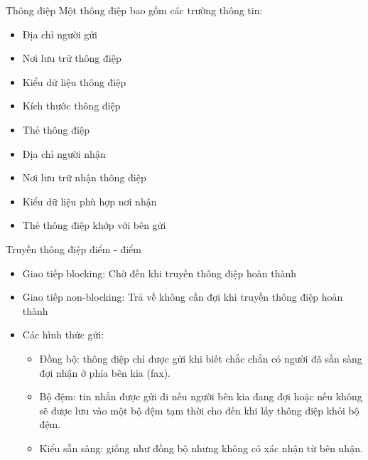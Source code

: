 \documentclass[10pt]{beamer}
\theoremstyle{remark}
\numberwithin{algocf}{section}
\numberwithin{equation}{section}
\numberwithin{dl}{section}
\numberwithin{figure}{section}
\begin{document}
\begin{frame}{Thông điệp}
    Một thông điệp bao gồm các trường thông tin:
    \begin{itemize}
        \item Địa chỉ người gửi
        \item Nơi lưu trữ thông điệp
        \item Kiểu dữ liệu thông điệp
        \item Kích thước thông điệp
        \item Thẻ thông điệp
        \item Địa chỉ người nhận 
        \item Nơi lưu trữ nhận thông điệp
        \item Kiểu dữ liệu phù hợp nơi nhận 
        \item Thẻ thông điệp khớp với bên gửi
    \end{itemize}
\end{frame}

\begin{frame}{Truyền thông điệp điểm - điểm}
    \begin{itemize}
        \item Giao tiếp blocking: Chờ đến khi truyền thông điệp hoàn thành
        \item Giao tiếp non-blocking: Trả về không cần đợi khi truyền thông điệp hoàn thành
        \item Các hình thức gửi:
        \begin{itemize}
            \item Đồng bộ: thông điệp chỉ được gửi khi biết chắc chắn có người đã sẵn sàng đợi nhận ở phía bên kia (fax).
            \item Bộ đệm: tin nhắn được gửi đi nếu người bên kia đang đợi hoặc nếu không sẽ được lưu vào một bộ đệm tạm thời cho đến khi lấy thông điệp khỏi bộ đệm.
            \item Kiểu sẵn sàng: giống như đồng bộ nhưng không có xác nhận từ bên nhận.
        \end{itemize}
    \end{itemize}
\end{frame}
\end{document}
